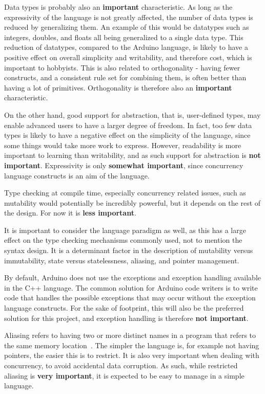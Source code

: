 Data types is probably also an \textbf{important} characteristic. As long as the expressivity of the language is not greatly affected, the number of data types is reduced by generalizing them. An example of this would be datatypes such as integers, doubles, and floats all being generalized to a single data type. This reduction of datatypes, compared to the Arduino language, is likely to have a positive effect on overall simplicity and writability, and therefore cost, which is important to hobbyists. This is also related to orthogonality - having fewer constructs, and a consistent rule set for combining them, is often better than having a lot of primitives. Orthogonality is therefore also an \textbf{important} characteristic.

On the other hand, good support for abstraction, that is, user-defined types, may enable advanced users to have a larger degree of freedom. In fact, too few data types is likely to have a negative effect on the simplicity of the language, since some things would take more work to express. However, readability is more important to learning than writability, and as such support for abstraction is \textbf{not important}. Expressivity is only \textbf{somewhat important}, since concurrency language constructs is an aim of the language.

Type checking at compile time, especially concurrency related issues, such as mutability would potentially be incredibly powerful, but it depends on the rest of the design. For now it is \textbf{less important}.

It is important to consider the language paradigm as well, as this has a large effect on the type checking mechanisms commonly used, not to mention the syntax design. It is a determinant factor in the description of mutability versus immutability, state versus statelessness, aliasing, and pointer management.

By default, Arduino does not use the exceptions and exception handling available in the C++ language. The common solution for Arduino code writers is to write code that handles the possible exceptions that may occur without the exception language constructs. For the sake of footprint, this will also be the preferred solution for this project, and exception handling is therefore \textbf{not important}.

Aliasing refers to having two or more distinct names in a program that refers to the same memory location~\cite{Sebesta2016}. The simpler the language is, for example not having pointers, the easier this is to restrict. It is also very important when dealing with concurrency, to avoid accidental data corruption. As such, while restricted aliasing is \textbf{very important}, it is expected to be easy to manage in a simple language.


